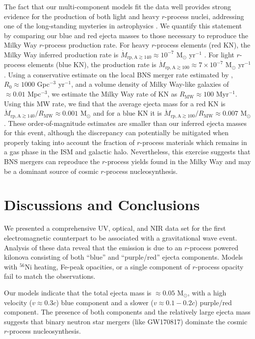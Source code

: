The fact that our multi-component models fit the data well provides strong evidence for the production of both light and heavy $r$-process nuclei, addressing one of the long-standing mysteries in astrophysics \citep{Burbidge+57,Cameron1957}. We quantify this statement by comparing our blue and red ejecta masses to those necessary to reproduce the Milky Way $r$-process production rate.  For heavy $r$-process elements (red KN), the Milky Way inferred production rate is $\dot{M}_\mathrm{rp,A\gtrsim 140}\approx 10^{-7}$ M$_\odot$ yr$^{-1}$ \citep{Bauswein+14}. For light $r$-process elements (blue KN), the production rate is $\dot{M}_\mathrm{rp,A\gtrsim 100}\approx 7\times 10^{-7}$ M$_\odot$ yr$^{-1}$ \citep{Qian2000}. Using a conservative estimate on the local BNS merger rate estimated by \citet{LIGOO1Rates}, $R_\mathrm{0}\approx 1000$ Gpc$^{-3}$ yr$^{-1}$, and a volume density of Milky Way-like galaxies of $\approx 0.01$ Mpc$^{-3}$, we estimate the Milky Way rate of KN as $R_\mathrm{MW}\approx 100$ Myr$^{-1}$.  Using this MW rate, we find that the average ejecta mass for a red KN is $\dot{M}_\mathrm{rp,A\gtrsim 140}/R_\mathrm{MW}\approx 0.001$ M$_\odot$ and for a blue KN it is $\dot{M}_\mathrm{rp,A\gtrsim 100}/R_\mathrm{MW}\approx 0.007$ M$_\odot$. These order-of-magnitude estimates are  smaller than our inferred ejecta masses for this event, although the discrepancy can potentially be mitigated when properly taking into account the fraction of $r$-process materials which remains in a gas phase in the ISM and galactic halo. Nevertheless, this exercise suggests that BNS mergers can reproduce the $r$-process yields found in the Milky Way and may be a dominant source of cosmic $r$-process nucleosynthesis.

\section{Discussions and Conclusions}
\label{sec:ch5_conc}

We presented a comprehensive UV, optical, and NIR data set for the first electromagnetic counterpart to be associated with a gravitational wave event.  Analysis of these data reveal that the emission is due to an $r$-process powered kilonova consisting of both ``blue'' and ``purple/red'' ejecta components. Models with $^{56}$Ni heating, Fe-peak opacities, or a single component of $r$-process opacity fail to match the observations.

Our models indicate that the total ejecta mass is $\approx 0.05$ M$_\odot$, with a high velocity ($v\approx 0.3c$) blue component and a slower ($v\approx 0.1-0.2c$) purple/red component.  The presence of both components and the relatively large ejecta mass suggests that binary neutron star mergers (like GW170817) dominate the cosmic $r$-process nucleosynthesis.

